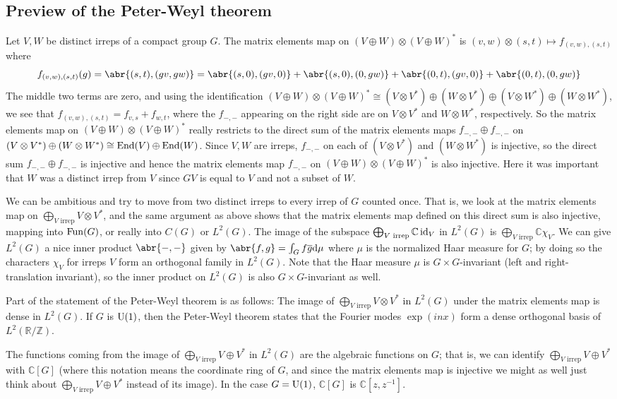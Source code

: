 \documentclass[../../rtnotes.tex]{subfiles}
\begin{document}
\subsection{Preview of the Peter-Weyl theorem}
Let $V,W$ be distinct irreps of a compact group $G$. The matrix elements map on $(V\oplus W)\otimes (V\oplus W)^\ast$ is $(v,w)\otimes(s,t)\mapsto f_{(v,w),(s,t)}$ where 
\[f_{(v,w),(s,t)}(g) = \abr{(s,t),(gv,gw)} = \abr{(s,0),(gv,0)} + \abr{(s,0),(0,gw)} + \abr{(0,t),(gv,0)} + \abr{(0,t),(0,gw)}\]
The middle two terms are zero, and using the identification $(V\oplus W)\otimes (V\oplus W)^\ast\cong (V\otimes V^\ast) \oplus (W\otimes V^\ast) \oplus(V\otimes W^\ast)\oplus(W\otimes W^\ast)$, we see that $f_{(v,w),(s,t)} = f_{v,s} + f_{w,t}$, where the $f_{-,-}$ appearing on the right side are on $V\otimes V^\ast$ and $W\otimes W^\ast$, respectively. So the matrix elements map on $(V\oplus W)\otimes (V\oplus W)^\ast$ really restricts to the direct sum of the matrix elements maps $f_{-,-}\oplus f_{-,-}$ on $(V\otimes V^\ast) \oplus (W\otimes W^\ast)\cong \operatorname{End}(V)\oplus \operatorname{End}(W)$. Since $V,W$ are irreps, $f_{-,-}$ on each of $(V\otimes V^\ast)$ and $(W\otimes W^\ast)$ is injective, so the direct sum $f_{-,-}\oplus f_{-,-}$ is injective and hence the matrix elements map $f_{-,-}$ on $(V\oplus W)\otimes (V\oplus W)^\ast$ is also injective. Here it was important that $W$ was a distinct irrep from $V$ since $GV$ is equal to $V$ and not a subset of $W$. 

We can be ambitious and try to move from two distinct irreps to every irrep of $G$ counted once. That is, we look at the matrix elements map on $\bigoplus_{V\text{ irrep}}V\otimes V^\ast$, and the same argument as above shows that the matrix elements map defined on this direct sum is also injective, mapping into $\operatorname{Fun}(G)$, or really into $C(G)$ or $L^2(G)$. The image of the subspace $\bigoplus_{V\text{ irrep}} \mathbb C\operatorname{id}_V$ in $L^2(G)$ is $\bigoplus_{V\text{ irrep}}\mathbb C\chi_V$. We can give $L^2(G)$ a nice inner product $\abr{-,-}$ given by $\abr{f,g} = \int_G f\overline g\dd \mu$ where $\mu$ is the normalized Haar measure for $G$; by doing so the characters $\chi_V$ for irreps $V$ form an orthogonal family in $L^2(G)$. Note that the Haar measure $\mu$ is $G\times G$-invariant (left and right-translation invariant), so the inner product on $L^2(G)$ is also $G\times G$-invariant as well.

Part of the statement of the Peter-Weyl theorem is as follows: The image of $\bigoplus_{V\text{ irrep}} V\otimes V^\ast$ in $L^2(G)$ under the matrix elements map is dense in $L^2(G)$. If $G$ is $\operatorname{U}(1)$, then the Peter-Weyl theorem states that the Fourier modes $\exp(inx)$ form a dense orthogonal basis of $L^2(\mathbb R/\mathbb Z)$.

The functions coming from the image of $\bigoplus_{V\text{ irrep}}V\oplus V^\ast$ in $L^2(G)$ are the algebraic functions on $G$; that is, we can identify $\bigoplus_{V\text{ irrep}}V\oplus V^\ast$ with $\mathbb C[G]$ (where this notation means the coordinate ring of $G$, and since the matrix elements map is injective we might as well just think about $\bigoplus_{V\text{ irrep}}V\oplus V^\ast$ instead of its image). In the case $G = \operatorname{U}(1)$, $\mathbb C[G]$ is $\mathbb C[z,z^{-1}]$.
\end{document}

